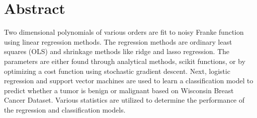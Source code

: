 \section*{Abstract} \label{sec:abstract}

Two dimensional polynomials of various orders are fit to noisy Franke function using linear regression methods. The regression methods are ordinary least squares (OLS) and shrinkage methods like ridge and lasso regression. The parameters are either found through analytical methods, scikit functions, or by optimizing a cost function using stochastic gradient descent. Next, logistic regression and support vector machines are used to learn a classification model to predict whether a tumor is benign or malignant based on Wisconsin Breast Cancer Dataset. Various statistics are utilized to determine the performance of the regression and classification models. 